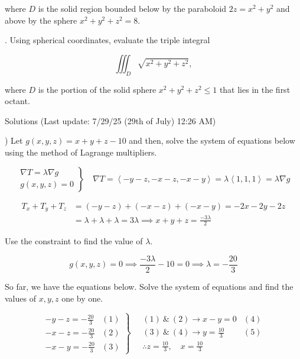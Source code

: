 \documentclass{article}
\begin{document}
\hfill

\noindent where $D$ is the solid region bounded below by the paraboloid $2z=x^2+y^2$ and above by the sphere $x^2+y^2+z^2=8$.

\hfill

. Using spherical coordinates, evaluate the triple integral

\[\iiint_D\sqrt{x^2+y^2+z^2},\]

\hfill

\noindent where $D$ is the portion of the solid sphere $x^2+y^2+z^2\leq1$ that lies in the first octant.

\newpage

\begin{center}
Solutions (Last update: 7/29/25 (29th of July) 12:26 AM)
\end{center}

) Let $g(x,y,z)=x+y+z-10$ and then, solve the system of equations below using the method of Lagrange multipliers.

\[
\left.
\begin{array}{ll}
\displaystyle\nabla T =\lambda \nabla g\\
\displaystyle g(x,y,z) = 0
\end{array}
\right\}\quad
\nabla T = \left\langle-y-z,-x-z,-x-y\right\rangle=\lambda\left\langle1,1,1\right\rangle= \lambda\nabla g
\]

\begin{align*}T_x+T_y + T_z&=(-y-z) +(-x-z) +(-x-y)=-2x-2y-2z\\&=\lambda+\lambda+\lambda=3\lambda\implies x+y+z=\frac{-3\lambda}{2}\end{align*}

\hfill

\noindent Use the constraint to find the value of $\lambda$.

\[g(x,y,z) = 0 \implies \frac{-3\lambda}{2}-10=0\implies \lambda=-\frac{20}{3}\]

\hfill

\noindent So far, we have the equations below. Solve the system of equations and find the values of $x,y,z$ one by one.

\[
\left.
\begin{array}{ll}
\displaystyle -y-z=-\frac{20}{3}&(1)\\[0.5cm]
\displaystyle -x-z=-\frac{20}{3}&(2)\\[0.5cm]
\displaystyle -x-y=-\frac{20}{3}&(3)
\end{array}
\right\}\quad
\begin{array}{ll}
\displaystyle (1)\:\&\:(2)\rightarrow x-y=0 & (4) \\[0.2cm]
\displaystyle (3)\:\&\:(4)\rightarrow y=\frac{10}{3}&(5)\\[0.5cm]
\displaystyle\therefore z=\frac{10}{3},\quad x=\frac{10}{3}
\end{array}
\]
\end{document}
